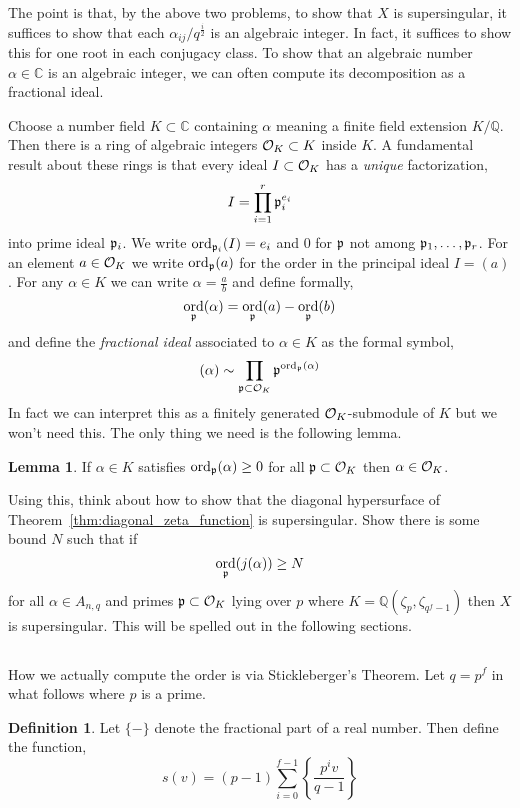 \documentclass[12pt]{article}
\DeclareMathOperator{\ord}{\mathrm{ord}}
\newcommand{\Q}{\mathbb{Q}}
\newcommand{\CC}{\mathbb{C}}
\theoremstyle{remark}
\theoremstyle{definition}
\newtheorem{lemma}[theorem]{Lemma}
\newtheorem{defn}[theorem]{Definition}
\begin{document}
The point is that, by the above two problems, to show that $X$ is supersingular, it suffices to show that each $\alpha_{ij} / q^{\frac{i}{2}}$ is an algebraic integer. In fact, it suffices to show this for one root in each conjugacy class. To show that an algebraic number $\alpha \in \CC$ is an algebraic integer, we can often compute its decomposition as a fractional ideal. 
\par
Choose a number field $K \subset \CC$ containing $\alpha$ meaning a finite field extension $K / \Q$. Then there is a ring of algebraic integers $\mathcal{O}_{K} \subset K$ inside $K$. A fundamental result about these rings is that every ideal $I \subset \mathcal{O}_{K}$ has a \textit{unique} factorization,
\[ I = \prod_{i = 1}^r \mathfrak{p}_i^{e_i} \]
into prime ideal $\mathfrak{p}_i$. We write $\ord_{\p_i}(I) = e_i$ and $0$ for $\mathfrak{p}$ not among $\mathfrak{p}_1, \dots, \mathfrak{p}_r$. For an element $a \in \mathcal{O}_{K}$ we write $\ord_{\p}(a)$ for the order in the principal ideal $I = (a)$. For any $\alpha \in K$ we can write $\alpha = \frac{a}{b}$ and define formally,
\[ \ord_{\p}(\alpha) = \ord_{\p}(a) - \ord_{\p}(b) \]
and define the \textit{fractional ideal} associated to $\alpha \in K$ as the formal symbol,
\[ (\alpha) \sim \prod_{\p \subset \iO_{K}} \p^{\ord_{\p}(\alpha)} \]
In fact we can interpret this as a finitely generated $\mathcal{O}_{K}$-submodule of $K$ but we won't need this. The only thing we need is the following lemma.

\begin{lemma}
If $\alpha \in K$ satisfies $\ord_{\p}(\alpha) \ge 0$ for all $\mathfrak{p} \subset \mathcal{O}_{K}$ then $\alpha \in \mathcal{O}_{K}$.
\end{lemma}

Using this, think about how to show that the diagonal hypersurface of Theorem~\ref{thm:diagonal_zeta_function} is supersingular. Show there is some bound $N$ such that if 
\[ \ord_{\p}(j(\alpha)) \ge N \]
for all $\alpha \in A_{n, q}$ and primes $\mathfrak{p} \subset \mathcal{O}_{K}$ lying over $p$ where $K = \Q(\zeta_p, \zeta_{q^{f}-1})$ then $X$ is supersingular. This will be spelled out in the following sections.

\subsection{}

How we actually compute the order is via Stickleberger's Theorem. Let $q = p^f$ in what follows where $p$ is a prime.


\begin{defn}
Let $\{ - \}$ denote the fractional part of a real number. Then define the function,
\[ s\left( v \right) = (p-1) \sum_{i = 0}^{f-1} \left\{ \frac{p^i v}{q - 1} \right\} \]
\end{defn}
\end{document}

